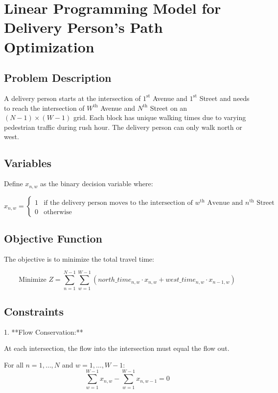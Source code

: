 \documentclass{article}
\begin{document}
\section*{Linear Programming Model for Delivery Person's Path Optimization}

\subsection*{Problem Description}

A delivery person starts at the intersection of \(1^{\text{st}}\) Avenue and \(1^{\text{st}}\) Street and needs to reach the intersection of \(W^{\text{th}}\) Avenue and \(N^{\text{th}}\) Street on an \( (N-1) \times (W-1) \) grid. Each block has unique walking times due to varying pedestrian traffic during rush hour. The delivery person can only walk north or west.

\subsection*{Variables}

Define \(x_{n,w}\) as the binary decision variable where:

\[
x_{n,w} = 
\begin{cases} 
1 & \text{if the delivery person moves to the intersection of } w^{\text{th}} \text{ Avenue and } n^{\text{th}} \text{ Street} \\
0 & \text{otherwise} 
\end{cases}
\]

\subsection*{Objective Function}

The objective is to minimize the total travel time:

\[
\text{Minimize } Z = \sum_{n=1}^{N-1} \sum_{w=1}^{W-1} (north\_time_{n,w} \cdot x_{n,w} + west\_time_{n,w} \cdot x_{n-1,w}) 
\]

\subsection*{Constraints}

1. **Flow Conservation:**

   At each intersection, the flow into the intersection must equal the flow out. 

   For all \(n = 1, \ldots, N\) and \(w = 1, \ldots, W-1\):
   \[
   \sum_{w=1}^{W-1} x_{n,w} - \sum_{w=1}^{W-1} x_{n,w-1} = 0
   \]
\end{document}
